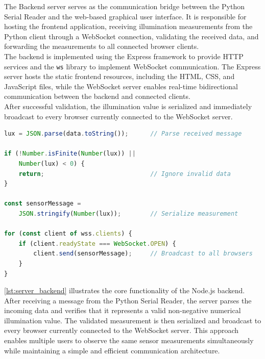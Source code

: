 \documentclass[11pt]{article}
\begin{document}
The Backend server serves as the communication bridge between the Python Serial Reader and the web-based graphical user interface. It is responsible for hosting the frontend application, receiving illumination measurements from the Python client through a WebSocket connection, validating the received data, and forwarding the measurements to all connected browser clients.\\[0.1em]

The backend is implemented using the Express framework to provide HTTP services and the \texttt{ws} library to implement WebSocket communication. The Express server hosts the static frontend resources, including the HTML, CSS, and JavaScript files, while the WebSocket server enables real-time bidirectional communication between the backend and connected clients.\\[0.1em]

After successful validation, the illumination value is serialized and immediately broadcast to every browser currently connected to the WebSocket server.

\begin{lstlisting}[language=JavaScript,
caption={Validation and broadcasting of sensor measurements in the Node.js backend.},
label={lst:server_backend}]
lux = JSON.parse(data.toString());      // Parse received message

if (!Number.isFinite(Number(lux)) ||
    Number(lux) < 0) {
    return;                             // Ignore invalid data
}

const sensorMessage =
    JSON.stringify(Number(lux));        // Serialize measurement

for (const client of wss.clients) {
    if (client.readyState === WebSocket.OPEN) {
        client.send(sensorMessage);     // Broadcast to all browsers
    }
}
\end{lstlisting}

\vspace{0.5em}

\autoref{lst:server_backend} illustrates the core functionality of the Node.js backend. After receiving a message from the Python Serial Reader, the server parses the incoming data and verifies that it represents a valid non-negative numerical illumination value. The validated measurement is then serialized and broadcast to every browser currently connected to the WebSocket server. This approach enables multiple users to observe the same sensor measurements simultaneously while maintaining a simple and efficient communication architecture.
\end{document}
